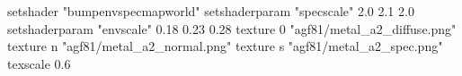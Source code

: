 setshader "bumpenvspecmapworld"
setshaderparam "specscale" 2.0 2.1 2.0
setshaderparam "envscale"  0.18 0.23 0.28
    texture 0 "agf81/metal_a2_diffuse.png"
    texture n "agf81/metal_a2_normal.png"
    texture s "agf81/metal_a2_spec.png"
    texscale 0.6